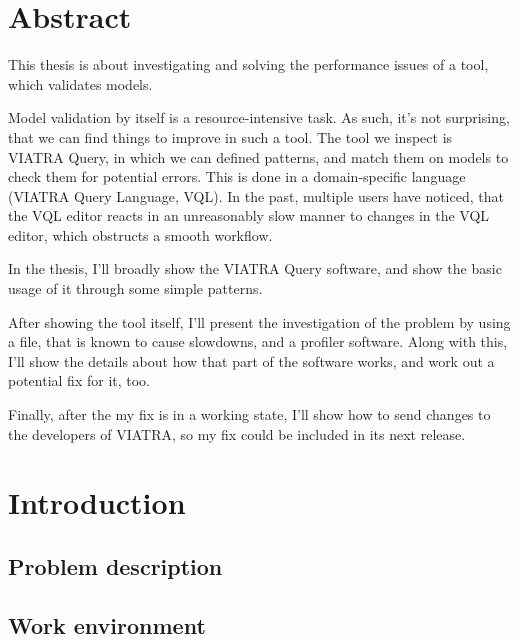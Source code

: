 \documentclass[11pt,a4paper,oneside]{report}
\begin{document}
\chapter*{Abstract}
\par
This thesis is about investigating and solving the performance issues of a tool,
which validates models.
\medskip
\par
Model validation by itself is a resource-intensive task. As such, it's not
surprising, that we can find things to improve in such a tool.
The tool we inspect is VIATRA Query, in which we can defined patterns, and match
them on models to check them for potential errors. This is done in a
domain-specific language (VIATRA Query Language, VQL). In the past, multiple
users have noticed, that the VQL editor reacts in an unreasonably slow manner to
changes in the VQL editor, which obstructs a smooth workflow.
\medskip
\par
In the thesis, I'll broadly show the VIATRA Query software, and show the
basic usage of it through some simple patterns.
\medskip
\par
After showing the tool itself, I'll present the investigation of the problem by
using a file, that is known to cause slowdowns, and a profiler software. Along
with this, I'll show the details about how that part of the software works, and
work out a potential fix for it, too.
\medskip
\par
Finally, after the my fix is in a working state, I'll show how to send changes
to the developers of VIATRA, so my fix could be included in its next release.
\vfill


\cleardoublepage
\selectthesislanguage
{}
\setcounter{romanPage}{\value{page}}



\chapter{Introduction}
\section{Problem description}
\section{Work environment}
\end{document}
